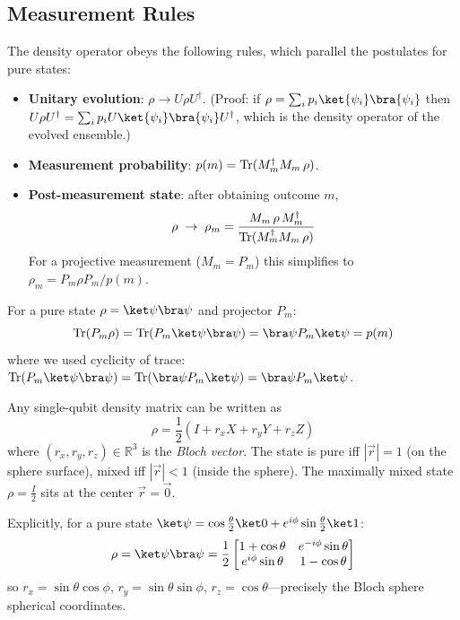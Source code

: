 \documentclass[oneside]{academica}
\begin{document}
\subsection{Measurement Rules}

The density operator obeys the following rules, which parallel the postulates for pure states:
\begin{itemize}
  \item \textbf{Unitary evolution}: $\rho \to U\rho U^\dagger$.
    (Proof: if $\rho=\sum_i p_i\ket{\psi_i}\bra{\psi_i}$ then $U\rho U^\dagger=\sum_i p_i U\ket{\psi_i}\bra{\psi_i}U^\dagger$, which is the density operator of the evolved ensemble.)
  \item \textbf{Measurement probability}: $p(m)=\operatorname{Tr}(M_m^\dagger M_m\,\rho)$.
  \item \textbf{Post-measurement state}: after obtaining outcome $m$,
    \begin{equation*}
      \rho \;\to\; \rho_m = \frac{M_m\,\rho\,M_m^\dagger}{\operatorname{Tr}(M_m^\dagger M_m\,\rho)}
    \end{equation*}
    For a projective measurement ($M_m=P_m$) this simplifies to $\rho_m = P_m\rho P_m / p(m)$.
\end{itemize}

\begin{example*}
  For a pure state $\rho=\ket\psi\bra\psi$ and projector $P_m$:
  \begin{equation*}
    \tr(P_m\rho) = \tr(P_m\ket\psi\bra\psi) = \bra\psi P_m\ket\psi = p(m)
  \end{equation*}
  where we used cyclicity of trace: $\tr(P_m\ket\psi\bra\psi)=\tr(\bra\psi P_m\ket\psi)=\bra\psi P_m\ket\psi$.
\end{example*}

\begin{example*}
  Any single-qubit density matrix can be written as
  \begin{equation*}
    \rho=\frac{1}{2}(I+r_x X+r_y Y+r_z Z)
  \end{equation*}
  where $(r_x,r_y,r_z)\in\mathbb{R}^3$ is the \emph{Bloch vector}.
  The state is pure iff $|\vec r|=1$ (on the sphere surface), mixed iff $|\vec r|<1$ (inside the sphere).
  The maximally mixed state $\rho=\frac{I}{2}$ sits at the center $\vec r=\vec 0$.

  Explicitly, for a pure state
  $\ket\psi=\cos\frac\theta2\ket0+e^{i\phi}\sin\frac\theta2\ket1$:
  \begin{equation*}
    \rho=\ket\psi\bra\psi=\frac12\begin{bmatrix}1+\cos\theta & e^{-i\phi}\sin\theta \\ e^{i\phi}\sin\theta & 1-\cos\theta\end{bmatrix}
  \end{equation*}
  so $r_x=\sin\theta\cos\phi$, $r_y=\sin\theta\sin\phi$, $r_z=\cos\theta$---precisely the Bloch sphere spherical coordinates.
\end{example*}
\end{document}
